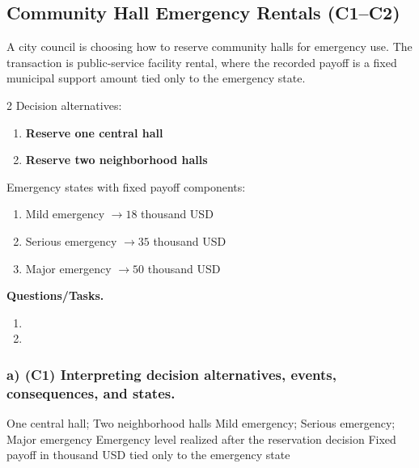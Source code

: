 	
	\subsection{Community Hall Emergency Rentals (C1--C2)}
	\label{sec:problem8-community-hall-emergency-rentals-c1-c2}
	A city council is choosing how to reserve community halls for emergency use. The transaction is public-service facility rental, where the recorded payoff is a fixed municipal support amount tied only to the emergency state.
	
	\begin{multicols}{2}
		Decision alternatives:
		\begin{enumerate}[label=\arabic*.]
			\item \textbf{Reserve one central hall}
			\item \textbf{Reserve two neighborhood halls}
		\end{enumerate}
	
			\columnbreak
	
		Emergency states with fixed payoff components:
		\begin{enumerate}[label=\arabic*.]
			\item Mild emergency $\to 18$ thousand USD
			\item Serious emergency $\to 35$ thousand USD
			\item Major emergency $\to 50$ thousand USD
		\end{enumerate}
	\end{multicols}

	\textbf{Questions/Tasks.}
	\begin{enumerate}[label=\textbf{\alph*)}]
		\item {}
		\item {}
	\end{enumerate}
	
	\subsubsection*{a) \textbf{(C1)} Interpreting decision alternatives, events, consequences, and states.}
	\label{subsec:problem8-community-hall-emergency-rentals-c1}
	\DecisionElementsTable
	{One central hall; Two neighborhood halls}
	{Mild emergency; Serious emergency; Major emergency}
	{Emergency level realized after the reservation decision}
	{Fixed payoff in thousand USD tied only to the emergency state}
	
